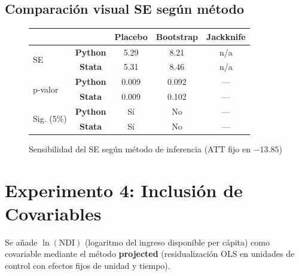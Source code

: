 \documentclass[11pt, a4paper]{article}
\newcommand{\py}{\textcolor{pyblue}{\textbf{Python}}}
\newcommand{\st}{\textcolor{stgreen}{\textbf{Stata}}}
\begin{document}
\subsection*{Comparación visual SE según método}

\begin{figure}[H]
\centering
\begin{tabular}{lcccc}
\toprule
& & \textbf{Placebo} & \textbf{Bootstrap} & \textbf{Jackknife} \\
\midrule
\multirow{2}{*}{SE}   & \py{} & 5.29 & 8.21 & n/a \\
                       & \st{} & 5.31 & 8.46 & n/a \\
\midrule
\multirow{2}{*}{p-valor} & \py{} & 0.009 & 0.092 & --- \\
                          & \st{} & 0.009 & 0.102 & --- \\
\midrule
\multirow{2}{*}{Sig. (5\%)} & \py{} & Sí & No & --- \\
                              & \st{} & Sí & No & --- \\
\bottomrule
\end{tabular}
\caption{Sensibilidad del SE según método de inferencia (ATT fijo en $-13.85$)}
\end{figure}

\newpage
\section{Experimento 4: Inclusión de Covariables}

Se añade $\ln(\text{NDI})$ (logaritmo del ingreso disponible per cápita) como covariable mediante el método \textbf{projected} (residualización OLS en unidades de control con efectos fijos de unidad y tiempo).
\end{document}
